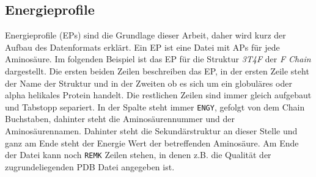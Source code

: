 \subsection{Energieprofile}
\label{sec:Energieprofil}
Energieprofile (EPs) sind die Grundlage dieser Arbeit, daher wird kurz der Aufbau des Datenformats erklärt. Ein \ac{EP} ist eine Datei mit \ac{APs} für jede Aminosäure. Im folgenden Beispiel ist das EP für die Struktur \emph{3T4F} der \emph{F Chain} dargestellt. Die ersten beiden Zeilen beschreiben das \ac{EP}, in der ersten Zeile steht der Name der Struktur und in der Zweiten ob es sich um ein globuläres oder alpha helikales Protein handelt. Die restlichen Zeilen sind immer gleich aufgebaut und Tabstopp separiert. In der Spalte steht immer \texttt{ENGY}, gefolgt von dem Chain Buchstaben, dahinter steht die Aminosäurennummer und der Aminosäurennamen. Dahinter steht die Sekundärstruktur an dieser Stelle und ganz am Ende steht der Energie Wert der betreffenden Aminosäure. Am Ende der Datei kann noch \texttt{REMK} Zeilen stehen, in denen z.B. die Qualität der zugrundeliegenden \ac{PDB} Datei angegeben ist.

